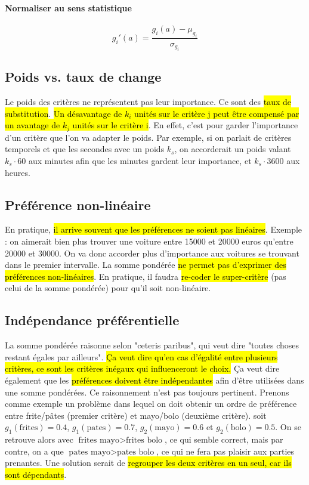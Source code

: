 \documentclass[a4paper, 12pt]{article}
\newcommand{\alinea}{
\hspace*{0.5cm}}
\begin{document}
			\paragraph{Normaliser au sens statistique}
				$$ g_i'(a) = \frac{g_i(a) - \mu_{g_i}}{\sigma_{g_i}} $$
	\subsection{Poids vs. taux de change}
		\alinea Le poids des critères ne représentent pas leur importance. Ce sont des \hl{taux de substitution}.
			\hl{Un désavantage de $k_i$ unités sur le critère j peut être compensé par un avantage de $k_j$ unités sur le critère i}.
			En effet, c'est pour garder l'importance d'un critère que l'on va adapter le poids.
			Par exemple, si on parlait de critères temporels et que les secondes avec un poids $k_s$, on accorderait un poids
			valant $k_s \cdot 60$ aux minutes afin que les minutes gardent leur importance, et $k_s \cdot 3600$ aux heures.
	\subsection{Préférence non-linéaire}
		\alinea En pratique, \hl{il arrive souvent que les préférences ne soient pas linéaires}. Exemple : on aimerait bien plus trouver
			une voiture entre 15000 et 20000 euros qu'entre 20000 et 30000. On va donc accorder plus d'importance aux voitures se 
			trouvant dans le premier intervalle. La somme pondérée \hl{ne permet pas d'exprimer des préférences non-linéaires}.
			En pratique, il faudra \hl{re-coder le super-critère} (pas celui de la somme pondérée) pour qu'il soit non-linéaire.
	\subsection{Indépendance préférentielle}
		\alinea La somme pondérée raisonne selon "ceteris paribus", qui veut dire "toutes choses restant égales par ailleurs". 
			\hl{\c Ca veut dire qu'en cas d'égalité entre plusieurs critères, ce sont les critères inégaux qui influenceront le choix.}
			\c Ca veut dire également que les \hl{préférences doivent être indépendantes} afin d'être utilisées dans une somme pondérées.
			Ce raisonnement n'est pas toujours pertinent. Prenons comme exemple un problème dans lequel on doit obtenir un ordre de
			préférence entre frite/pâtes (premier critère) et mayo/bolo (deuxième critère). soit $g_1(\text{frites}) = 0.4$, 
			$g_1(\text{pates}) = 0.7$, $g_2(\text{mayo}) = 0.6$ et $g_2(\text{bolo}) = 0.5$. On se retrouve alors avec
			$\text{frites mayo} > \text{frites bolo}$, ce qui semble correct, mais par contre, on a que 
			$\text{pates mayo} > \text{pates bolo}$, ce qui ne fera pas plaisir aux parties prenantes. Une solution serait de 
			\hl{regrouper les deux critères en un seul, car ils sont dépendants}.
\end{document}
